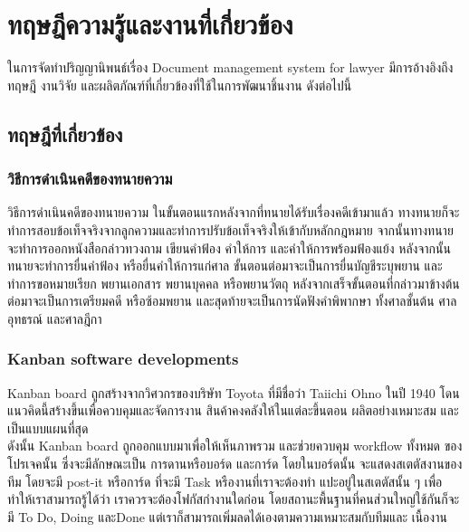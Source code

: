 \documentclass[12pt,oneside,openright,a4paper]{cpe-thai-project}
\begin{document}
\chapter{ทฤษฎีความรู้และงานที่เกี่ยวข้อง}

\hspace*{1cm}ในการจัดทําปริญญานิพนธ์เรื่อง Document management system for lawyer มีการอ้างอิงถึงทฤษฎี งานวิจัย และผลิตภัณฑ์ที่เกี่ยวข้องที่ใช้ในการพัฒนาชิ้นงาน ดังต่อไปนี้

\section{ทฤษฎีที่เกี่ยวข้อง}

\subsection{วิธีการดำเนินคดีของทนายความ} 
\hspace*{1cm}วิธีการดำเนินคดีของทนายความ \cite{LawyerDefinition, StepOfLawyer} ในขั้นตอนแรกหลังจากที่ทนายได้รับเรื่องคดีเข้ามาแล้ว ทางทนายก็จะทำการสอบข้อเท็จจริงจากลูกความและทำการปรับข้อเท็จจริงให้เข้ากับหลักกฎหมาย จากนั้นทางทนายจะทำการออกหนังสือกล่าวทวงถาม เขียนคำฟ้อง คำให้การ และคำให้การพร้อมฟ้องแย้ง หลังจากนั้นทนายจะทำการยื่นคำฟ้อง หรือยื่นคำให้การแก่ศาล ขั้นตอนต่อมาจะเป็นการยื่นบัญชีระบุพยาน และทำการขอหมายเรียก พยานเอกสาร พยานบุคคล หรือพยานวัตถุ หลังจากเสร็จขั้นตอนที่กล่าวมาข้างต้นต่อมาจะเป็นการเตรียมคดี หรือซ้อมพยาน และสุดท้ายจะเป็นการนัดฟังคำพิพากษา ทั้งศาลชั้นต้น ศาลอุทธรณ์ และศาลฎีกา 


\subsection{Kanban software developments} 
\hspace*{1cm}Kanban board \cite{WhatIsKanban, KanbanConcept} ถูกสร้างจากวิศวกรของบริษัท Toyota ที่มีชื่อว่า Taiichi Ohno ในปี 1940 โดนแนวคิดนี้สร้างขึ้นเพื่อควบคุมและจัดการงาน สินค้าคงคลังให้ในแต่ละขึ้นตอน ผลิตอย่างเหมาะสม และเป็นแบบแผนที่สุด\\
\hspace*{1cm}ดังนั้น Kanban board ถูกออกแบบมาเพื่อให้เห็นภาพรวม และช่วยควบคุม workflow ทั้งหมด ของโปรเจคนั้น ซึ่งจะมีลักษณะเป็น การดานหรือบอร์ด และการ์ด โดยในบอร์ดนั้น จะแสดงสเตตัสงานของทีม โดยจะมี post-it หรือการ์ด ที่จะมี Task หรืองานที่เราจะต้องทำ แปะอยู่ในสเตตัสนั้น ๆ เพื่อทำให้เราสามารถรู้ได้ว่า เราควรจะต้องโฟกัสกำงานใดก่อน โดยสถานะพื้นฐานที่คนส่วนใหญ่ใช้กันก็จะมี To Do, Doing และDone แต่เราก็สามารถเพิ่มลดได้เองตามความเหมาะสมกับทีมและ เนื้องาน
\end{document}
